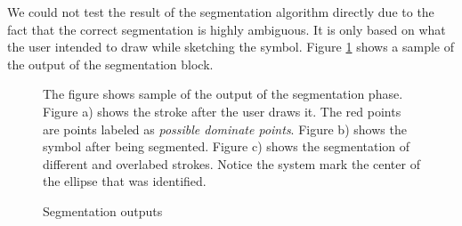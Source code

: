 \documentclass[a4paper,10pt]{IEEEconf}
\begin{document}
We could not test the result of the segmentation algorithm directly due to the fact that the correct segmentation is highly ambiguous. It is only based on what the user intended to draw while sketching the symbol. Figure \ref{fig:SampleSeg} shows a sample of the output of the segmentation block.  
  
  
 
  
\begin{figure}[]
	\centering
 
		
	\caption{Segmentation outputs} The figure shows sample of the output of the segmentation phase. Figure a) shows the stroke after the user draws it. The red points are points labeled as \textit{possible dominate points}. Figure b) shows the symbol after being segmented. Figure c) shows the segmentation of different and overlabed strokes. Notice the system mark the center of the ellipse that was identified.
	\label{fig:SampleSeg}
\end{figure}
\end{document}
